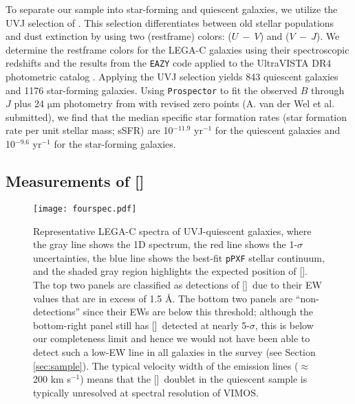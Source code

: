 \documentclass[twocolumn,natbib,iop,hyperref]{aastex62}
\newcommand{\oii}{[\ion{O}{2}]}
\begin{document}
To separate our sample into star-forming and quiescent galaxies, we utilize the UVJ selection of \citet{2011ApJ...735...86W}.  This selection differentiates between old stellar populations and dust extinction by using two (restframe) colors: ($U~-~V$) and ($V~-~J$).  We determine the restframe colors for the LEGA-C galaxies using their spectroscopic redshifts and the results from the \texttt{EAZY} code \citep{2008ApJ...686.1503B} applied to the UltraVISTA DR4 photometric catalog \citep{2012AA...544A.156M,2013ApJS..206....8M}.  Applying the UVJ selection yields 843 quiescent galaxies and 1176 star-forming galaxies.  Using \texttt{Prospector} \citep{2017ApJ...837..170L,2019ascl.soft05025J} to fit the observed $B$ through $J$ plus 24 $\mathrm{\mu}$m photometry from \citet{2013ApJS..206....8M} with revised zero points (A. van der Wel et al. submitted), we find that the median specific star formation rates (star formation rate per unit stellar mass; sSFR) are 10$^{-11.9}$ yr$^{-1}$ for the quiescent galaxies and 10$^{-9.6}$ yr$^{-1}$ for the star-forming galaxies.



\subsection{Measurements of \oii}
\label{sec:pf}

\begin{figure*}
\begin{center}
\texttt{[image: fourspec.pdf]} %
\caption{Representative LEGA-C spectra of UVJ-quiescent galaxies, where the gray line shows the 1D spectrum, the red line shows the 1-$\sigma$ uncertainties, the blue line shows the best-fit \texttt{pPXF} stellar continuum, and the shaded gray region highlights the expected position of \oii.  The top two panels are classified as detections of \oii\ due to their EW values that are in excess of 1.5 \AA.  The bottom two panels are ``non-detections'' since their EWs are below this threshold; although the bottom-right panel still has \oii\ detected at nearly 5-$\sigma$, this is below our completeness limit and hence we would not have been able to detect such a low-EW line in all galaxies in the survey (see Section \ref{sec:sample}).  The typical velocity width of the emission lines ($\approx$ 200 km s$^{-1}$) means that the \oii\ doublet in the quiescent sample is typically unresolved at spectral resolution of VIMOS.}
\label{fig:specs}
\end{center}
\end{figure*}
\end{document}
